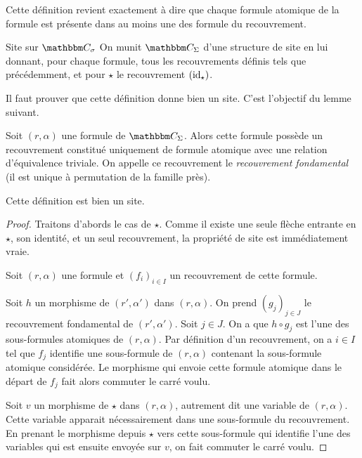 Cette définition revient exactement à dire que chaque formule atomique de la formule est
présente dans au moins une des formule du recouvrement.

\begin{defi}{Site sur $\C_\sigma$}
    On munit $\C_\Sigma$ d'une structure de site en lui donnant, pour chaque formule,
    tous les recouvrements définis tels que précédemment, et pour $\star$ le recouvrement
    $(\operatorname{id}_\star)$.
\end{defi}

Il faut prouver que cette définition donne bien un site. C'est l'objectif du
lemme suivant.

\begin{rem}
    Soit $(r,\alpha)$ une formule de $\C_\Sigma$. Alors cette formule possède un
    recouvrement constitué uniquement de formule atomique avec une relation d'équivalence
    triviale. On appelle ce recouvrement le \emph{recouvrement fondamental}
    (il est unique à permutation de la famille près).
\end{rem}

\begin{lem}
    Cette définition est bien un site.
\end{lem}

\begin{proof}
    Traitons d'abords le cas de $\star$. Comme il existe une seule flèche
    entrante en $\star$, son identité, et un seul recouvrement, la propriété de
    site est immédiatement vraie.

    Soit $(r,\alpha)$ une formule et $(f_i)_{i\in I}$ un recouvrement de cette formule.
    
    Soit $h$ un morphisme de $(r', \alpha')$ dans $(r,\alpha)$. On prend
    $(g_j)_{j\in J}$ le recouvrement fondamental de $(r', \alpha')$. Soit $j\in
    J$. On a que $h\circ g_j$ est l'une des sous-formules atomiques de
    $(r,\alpha)$. Par définition d'un recouvrement, on a $i\in I$ tel que $f_j$
    identifie une sous-formule de $(r,\alpha)$ contenant la sous-formule
    atomique considérée. Le morphisme qui envoie cette formule atomique dans le
    départ de $f_j$ fait alors commuter le carré voulu.

    Soit $v$ un morphisme de $\star$ dans $(r,\alpha)$, autrement dit une
    variable de $(r,\alpha)$.  Cette variable apparait nécessairement dans une
    sous-formule du recouvrement. En prenant le morphisme depuis $\star$ vers
    cette sous-formule qui identifie l'une des variables qui est ensuite
    envoyée sur $v$, on fait commuter le carré voulu.
\end{proof}

